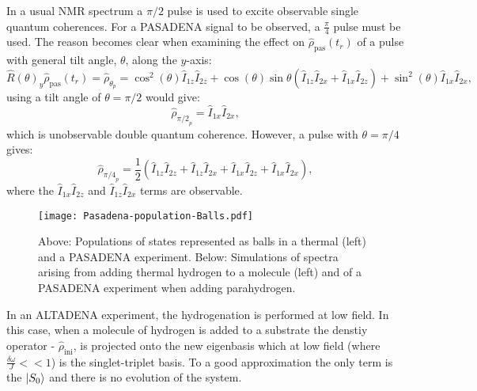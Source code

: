  In a usual NMR spectrum a $\pi/2$ pulse is used to excite observable single quantum coherences. For a PASADENA signal to
 be observed, a $\frac{\pi}{4}$ pulse must be used. The reason becomes clear when examining the effect on $\hat{\rho}_{\text{pas}}(t_r)$ of a pulse with general
 tilt angle, $\theta$, along the $y$-axis:
\begin{equation}
  \hat{R}(\theta)_y\hat{\rho}_{\text{pas}}(t_r) = \hat{\rho}_\theta_p = \cos^2(\theta)\hat{I}_{1z}\hat{I}_{2z} +
  \cos(\theta)\sin{\theta}(\hat{I}_{1z}\hat{I}_{2x} + \hat{I}_{1x}\hat{I}_{2z}) + \sin^2(\theta)\hat{I}_{1x}\hat{I}_{2x},
\end{equation}
using a tilt angle of $\theta = \pi/2$ would give:
\begin{equation}
  \hat{\rho}_{\pi/2}_p  = \hat{I}_{1x}\hat{I}_{2x},
\end{equation}
which is unobservable double quantum coherence. However, a pulse with $\theta = \pi/4$ gives:
\begin{equation}
  \hat{\rho}_{\pi/4}_p = \frac{1}{2}(\hat{I}_{1z}\hat{I}_{2z} + \hat{I}_{1z}\hat{I}_{2x} + \hat{I}_{1x}\hat{I}_{2z} + \hat{I}_{1x}\hat{I}_{2x}),
\end{equation}
where the $\hat{I}_{1x}\hat{I}_{2z}$ and $\hat{I}_{1z}\hat{I}_{2x}$ terms are observable.

 \begin{figure*}[h]
   \begin{center}
   \texttt{[image: Pasadena-population-Balls.pdf]}
   \end{center}
   \caption{Above: Populations of states represented as balls in a thermal (left) and a PASADENA experiment. Below: Simulations
   of spectra arising from adding thermal hydrogen to a molecule (left) and of a PASADENA experiment when adding parahydrogen.}
   \label{fig:PASADENA}
 \end{figure*}

 In an ALTADENA experiment, the hydrogenation is performed at low field. In this case, when a molecule of hydrogen
 is added to a substrate the denstiy operator - $\hat{\rho}_\text{ini}$, is projected onto the new eigenbasis which
 at low field (where $\frac{\delta{\omega}}{J}<<1$) is the singlet-triplet basis. To a good approximation the only term
 is the $\ket{S_0}$ and there is no evolution of the system.

